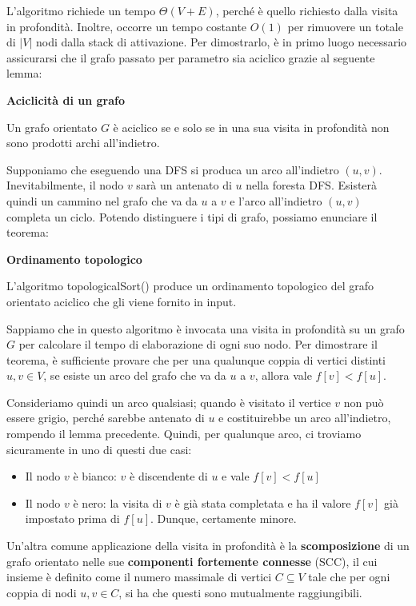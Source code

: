 \noindent L'algoritmo richiede un tempo $\Theta(V+E)$, perché è quello richiesto dalla visita in profondità. Inoltre, occorre un tempo costante $O(1)$ per rimuovere un totale di $|V|$ nodi dalla stack di attivazione. Per dimostrarlo, è in primo luogo necessario assicurarsi che il grafo passato per parametro sia aciclico grazie al seguente lemma: \begin{lemma}
	\textbf{Aciclicità di un grafo}\par
	\noindent Un grafo orientato $G$ è aciclico se e solo se in una sua visita in profondità non sono prodotti archi all'indietro.	
\end{lemma}
\noindent Supponiamo che eseguendo una DFS si produca un arco all'indietro $(u,v)$. Inevitabilmente, il nodo $v$ sarà un antenato di $u$ nella foresta DFS. Esisterà quindi un cammino nel grafo che va da $u$ a $v$ e l'arco all'indietro $(u,v)$ completa un ciclo. Potendo distinguere i tipi di grafo, possiamo enunciare il teorema: \begin{teorema}
	\textbf{Ordinamento topologico}\par
	\noindent L'algoritmo topologicalSort() produce un ordinamento topologico del grafo orientato aciclico che gli viene fornito in input.
\end{teorema}
\noindent Sappiamo che in questo algoritmo è invocata una visita in profondità su un grafo $G$ per calcolare il tempo di elaborazione di ogni suo nodo. Per dimostrare il teorema, è sufficiente provare che per una qualunque coppia di vertici distinti $u,v\in V$, se esiste un arco del grafo che va da $u$ a $v$, allora vale $f[v] < f[u]$.\par
Consideriamo quindi un arco qualsiasi; quando è visitato il vertice $v$ non può essere grigio, perché sarebbe antenato di $u$ e costituirebbe un arco all'indietro, rompendo il lemma precedente. Quindi, per qualunque arco, ci troviamo sicuramente in uno di questi due casi: \begin{itemize}
	\item Il nodo $v$ è bianco: $v$ è discendente di $u$ e vale $f[v] < f[u]$
	\item Il nodo $v$ è nero: la visita di $v$ è già stata completata e ha il valore $f[v]$ già impostato prima di $f[u]$. Dunque, certamente minore.
\end{itemize}
\noindent Un'altra comune applicazione della visita in profondità è la \textbf{scomposizione} di un grafo orientato nelle sue \textbf{componenti fortemente connesse} (SCC), il cui insieme è definito come il numero massimale di vertici $C\subseteq V$ tale che per ogni coppia di nodi $u,v\in C$, si ha che questi sono mutualmente raggiungibili.\par
